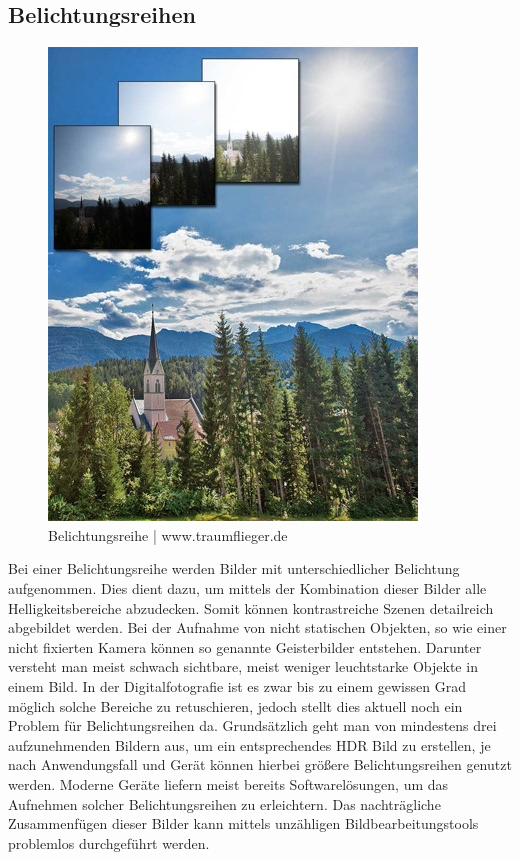 \documentclass[conference]{IEEEtran}
\begin{document}
\subsection{Belichtungsreihen}
\begin{figure}[H]
	\centering
	\includegraphics[scale=0.6]{img/belichtungsreihen.jpg}
	\caption{Belichtungsreihe | www.traumflieger.de}
	\label{fig}
\end{figure}
Bei einer Belichtungsreihe werden Bilder mit unterschiedlicher Belichtung aufgenommen. Dies dient dazu, um mittels der Kombination dieser Bilder alle Helligkeitsbereiche abzudecken. Somit können kontrastreiche Szenen detailreich abgebildet werden. Bei der Aufnahme von nicht statischen Objekten, so wie einer nicht fixierten Kamera können so genannte Geisterbilder entstehen. Darunter versteht man meist schwach sichtbare, meist weniger leuchtstarke Objekte in einem Bild. In der Digitalfotografie ist es zwar bis zu einem gewissen Grad möglich solche Bereiche zu retuschieren, jedoch stellt dies aktuell noch ein Problem für Belichtungsreihen da. Grundsätzlich geht man von mindestens drei aufzunehmenden Bildern aus, um ein entsprechendes HDR Bild zu erstellen, je nach Anwendungsfall und Gerät können hierbei größere Belichtungsreihen genutzt werden. Moderne Geräte liefern meist bereits Softwarelösungen, um das Aufnehmen solcher Belichtungsreihen zu erleichtern. Das nachträgliche Zusammenfügen dieser Bilder kann mittels unzähligen Bildbearbeitungstools problemlos durchgeführt werden.
\end{document}
